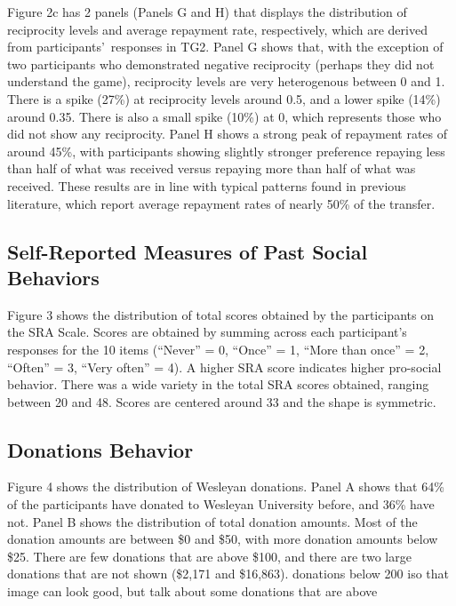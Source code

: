 \documentclass[12pt]{article}
\begin{document}
{\color{green}Figure 2c} has 2 panels (Panels G and H) that displays the distribution of reciprocity levels and average repayment rate, respectively, which are derived from participants\rq \ responses in TG2. Panel G shows that, with the exception of two participants who demonstrated negative reciprocity (perhaps they did not understand the game), reciprocity levels are very heterogenous between 0 and 1. There is a spike (27\%) at reciprocity levels around 0.5, and a lower spike (14\%) around 0.35. There is also a small spike (10\%) at 0, which represents those who did not show any reciprocity. Panel H shows a strong peak of repayment rates of around 45\%, with participants showing slightly stronger preference repaying less than half of what was received versus repaying more than half of what was received. These results are in line with typical patterns found in previous literature, which report average repayment rates of nearly 50\% of the transfer.


\subsection{Self-Reported Measures of Past Social Behaviors}

{\color{green}Figure 3} shows the distribution of total scores obtained by the participants on the SRA Scale. Scores are obtained by summing across each participant\rq s responses for the 10 items (``Never'' = 0, ``Once'' = 1, ``More than once'' = 2, ``Often'' = 3, ``Very often'' = 4). A higher SRA score indicates higher pro-social behavior. There was a wide variety in the total SRA scores obtained, ranging between 20 and 48. Scores are centered around 33 and the shape is symmetric.

\subsection{Donations Behavior}

{\color{green}Figure 4} shows the distribution of Wesleyan donations. Panel A shows that 64\% of the participants have donated to Wesleyan University before, and 36\% have not. Panel B shows the distribution of total donation amounts. Most of the donation amounts are between \$0 and \$50, with more donation amounts below \$25. There are few donations that are above \$100, and there are two large donations that are not shown (\$2,171 and \$16,863). {\color{red} donations below 200 iso that image can look good, but talk about some donations that are above}
\end{document}
